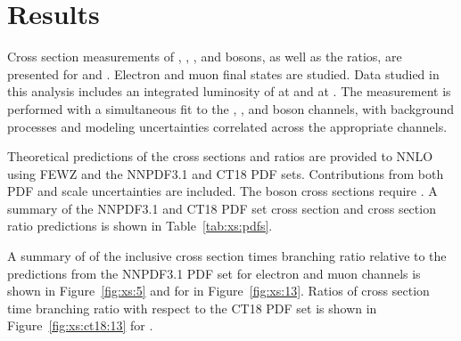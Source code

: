 \chapter{Results}\label{ch:results}
Cross section measurements of \Wp, \Wm, \W, and \Z bosons, as well as the ratios, are presented for \sg and \sh. Electron and muon final states are studied. Data studied in this analysis includes an integrated luminosity of \lumig at \sg and \lumih at \sh. The measurement is performed with a simultaneous fit to the \Wp, \Wm, and \Z boson channels, with background processes and modeling uncertainties correlated across the appropriate channels. 

Theoretical predictions of the cross sections and ratios are provided to NNLO using FEWZ and the NNPDF3.1 and CT18 PDF sets. Contributions from both PDF and scale uncertainties are included. The \Z boson cross sections require \masswindow. A summary of the NNPDF3.1 and CT18 PDF set cross section and cross section ratio predictions is shown in Table~\ref{tab:xs:pdfs}.

A summary of of the inclusive cross section times branching ratio relative to the predictions from the NNPDF3.1 PDF set for \sg electron and muon channels is shown in Figure~\ref{fig:xs:5} and for \sh in Figure~\ref{fig:xs:13}. Ratios of cross section time branching ratio with respect to the CT18 PDF set is shown in Figure~\ref{fig:xs:ct18:13} for \sh.








%

% 
% 



